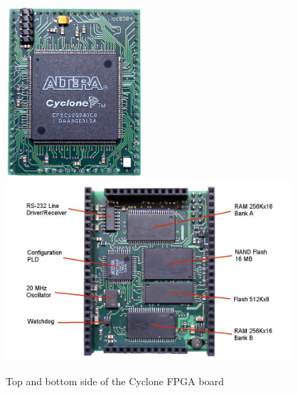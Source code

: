 \begin{figure}[htb]
    \centering
    \includegraphics[height=64mm]{appendix/cycore_top}
    \includegraphics[height=67mm]{appendix/cycore_bottom}
    \caption{Top and bottom side of the Cyclone FPGA board}
\end{figure}
